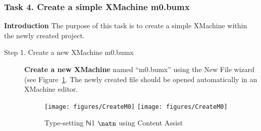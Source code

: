 \subsubsection{Task 4. Create a simple XMachine m0.bumx}\label{CreateMachine}
\textbf{Introduction} The purpose of this task is to create a simple XMachine within the newly created project.

\begin{description}
\item[Step 1. Create a new XMachine m0.bumx] \textbf{Create a new XMachine} named ``m0.bumx'' using the New File wizard (see Figure~\ref{fig:CreateM0}. The newly created file should be opened automatically in an XMachine editor.
  \begin{figure}[!htbp]
    \centering
    \texttt{[image: figures/CreateM0]}
    \else
    \texttt{[image: figures/CreateM0]}
    \endif
    \caption{Type-setting  ℕ1 \else $\natn$ \endif using Content Assist}
    \label{fig:CreateM0}
  \end{figure}


\end{description}
